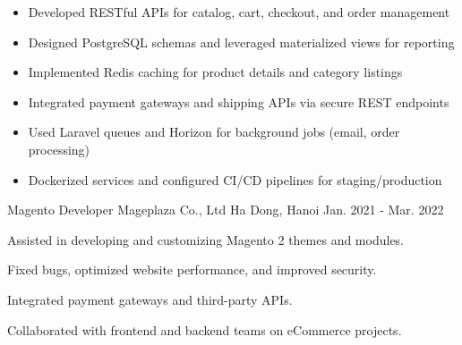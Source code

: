 \begin{cventries}
{\begin{cvitems}
        \begin{itemize}[label=•,itemsep=0.15em]
          \item {Developed RESTful APIs for catalog, cart, checkout, and order management}
          \item {Designed PostgreSQL schemas and leveraged materialized views for reporting}
          \item {Implemented Redis caching for product details and category listings}
          \item {Integrated payment gateways and shipping APIs via secure REST endpoints}
          \item {Used Laravel queues and Horizon for background jobs (email, order processing)}
          \item {Dockerized services and configured CI/CD pipelines for staging/production}
        \end{itemize}
        \vspace{0.5em}
      \end{cvitems}
    }

  \cventry
    {Magento Developer} %
    {Mageplaza Co., Ltd} %
    {Ha Dong, Hanoi} %
    {Jan. 2021 - Mar. 2022} %
    {
      \begin{cvitems} %
        \item {Assisted in developing and customizing Magento 2 themes and modules.}
        \item {Fixed bugs, optimized website performance, and improved security.}
        \item {Integrated payment gateways and third-party APIs.}
        \item {Collaborated with frontend and backend teams on eCommerce projects.}
      \end{cvitems}
    }

\end{cventries}
